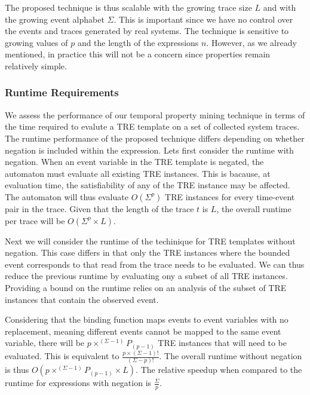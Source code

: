 \documentclass[]{sigplanconf}
\begin{document}
The proposed technique is thus scalable with the growing trace size $L$ and with the growing event alphabet $\Sigma$. This is important since we have no control over the events and traces generated by real systems. The technique is sensitive to growing values of $p$ and the length of the expressions $n$. However, as we already mentioned, in practice this will not be a concern since properties remain relatively simple.


\subsubsection{Runtime Requirements}

We assess the performance of our temporal property mining technique in terms of the time required to evalute a TRE template on a set of collected system traces.
The runtime performance of the proposed technique differs depending on whether negation is included within the expression.
Lets first consider the runtime with negation. When an event variable in the TRE template is negated, the automaton must evaluate all existing TRE instances. This is bacause, at evaluation time, the satisfiability of any of the TRE instance may be affected. The automaton will thus evaluate $O(\Sigma^p)$ TRE instances for every time-event pair in the trace. Given that the length of the trace $t$ is $L$, the overall runtime per trace will be $O(\Sigma^p \times L)$.

Next we will consider the runtime of the techinique for TRE templates without negation. This case differs in that only the TRE instances where the bounded event corresponds to that read from the trace needs to be evaluated. We can thus reduce the previous runtime by evaluating ony a subset of all TRE instances. Providing a bound on the runtime relies on an analysis of the subset of TRE instances that contain the observed event.

Considering that the binding function maps events to event variables with no replacement, meaning different events cannot be mapped to the same event variable, there will be $p \times ^{(\Sigma - 1)}P_{(p - 1)}$ TRE instances that will need to be evaluated. This is equivalent to $\frac{p \times (\Sigma - 1)!}{(\Sigma - p)!}$. The overall runtime without negation is thus
$O(p \times ^{(\Sigma - 1)}P_{(p - 1)} \times L)$. The relative speedup when compared to the runtime for expressions with negation is $\frac{\Sigma}{p}$.

\end{document}
